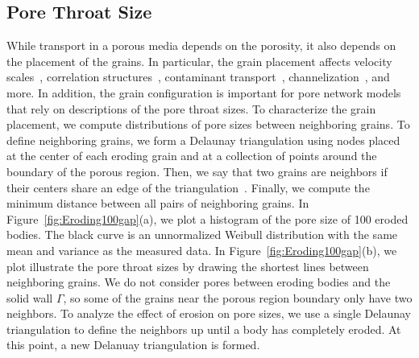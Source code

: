 \documentclass[preprint,10pt]{elsarticle}
\begin{document}
\subsection{Pore Throat Size}
\label{sec:throats}
While transport in a porous media depends on the porosity, it also
depends on the placement of the grains.  In particular, the grain
placement affects velocity scales~\cite{ali-par-wei-bre2017},
correlation structures~\cite{leb-ded-dav-bou2007}, contaminant
transport~\cite{knu-car2005},
channelization~\cite{sie-ili-pri-riv-gua2019,berhanu2012shape}, and
more. In addition, the grain configuration is important for pore network
models~\cite{bry-kin-mel1993, bry-mel-cad1993, bij-blu2006} that rely on
descriptions of the pore throat sizes. To characterize the grain
placement, we compute distributions of pore sizes between neighboring
grains.  To define neighboring grains, we form a Delaunay triangulation
using nodes placed at the center of each eroding grain and at a
collection of points around the boundary of the porous region.  Then, we
say that two grains are neighbors if their centers share an edge of the
triangulation~\cite{dea-qua-bir-jua2018}.  Finally, we compute the
minimum distance between all pairs of neighboring grains.  In
Figure~\ref{fig:Eroding100gap}(a), we plot a histogram of the pore size
of 100 eroded bodies.  The black curve is an unnormalized Weibull
distribution with the same mean and variance as the measured data.  In
Figure~\ref{fig:Eroding100gap}(b), we plot illustrate the pore throat
sizes by drawing the shortest lines between neighboring grains.  We do
not consider pores between eroding bodies and the solid wall $\Gamma$,
so some of the grains near the porous region boundary only have two
neighbors.  To analyze the effect of erosion on pore sizes, we use a
single Delaunay triangulation to define the neighbors up until a body
has completely eroded. At this point, a new Delanuay triangulation is
formed.
\end{document}
